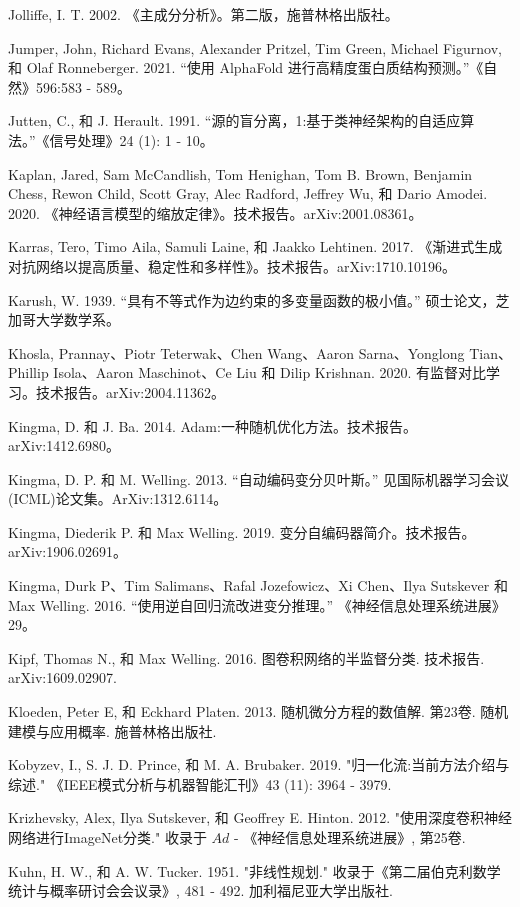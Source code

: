 \documentclass[10pt]{article}
\begin{document}
Jolliffe, I. T. 2002. 《主成分分析》。第二版，施普林格出版社。

Jumper, John, Richard Evans, Alexander Pritzel, Tim Green, Michael Figurnov, 和 Olaf Ronneberger. 2021. “使用 AlphaFold 进行高精度蛋白质结构预测。”《自然》596:583 - 589。

Jutten, C., 和 J. Herault. 1991. “源的盲分离，1:基于类神经架构的自适应算法。”《信号处理》24 (1): 1 - 10。

Kaplan, Jared, Sam McCandlish, Tom Henighan, Tom B. Brown, Benjamin Chess, Rewon Child, Scott Gray, Alec Radford, Jeffrey Wu, 和 Dario Amodei. 2020. 《神经语言模型的缩放定律》。技术报告。arXiv:2001.08361。

Karras, Tero, Timo Aila, Samuli Laine, 和 Jaakko Lehtinen. 2017. 《渐进式生成对抗网络以提高质量、稳定性和多样性》。技术报告。arXiv:1710.10196。

Karush, W. 1939. “具有不等式作为边约束的多变量函数的极小值。” 硕士论文，芝加哥大学数学系。

Khosla, Prannay、Piotr Teterwak、Chen Wang、Aaron Sarna、Yonglong Tian、Phillip Isola、Aaron Maschinot、Ce Liu 和 Dilip Krishnan. 2020. 有监督对比学习。技术报告。arXiv:2004.11362。

Kingma, D. 和 J. Ba. 2014. Adam:一种随机优化方法。技术报告。arXiv:1412.6980。

Kingma, D. P. 和 M. Welling. 2013. “自动编码变分贝叶斯。” 见国际机器学习会议(ICML)论文集。ArXiv:1312.6114。

Kingma, Diederik P. 和 Max Welling. 2019. 变分自编码器简介。技术报告。arXiv:1906.02691。

Kingma, Durk P、Tim Salimans、Rafal Jozefowicz、Xi Chen、Ilya Sutskever 和 Max Welling. 2016. “使用逆自回归流改进变分推理。” 《神经信息处理系统进展》29。

Kipf, Thomas N., 和 Max Welling. 2016. 图卷积网络的半监督分类. 技术报告. arXiv:1609.02907.

Kloeden, Peter E, 和 Eckhard Platen. 2013. 随机微分方程的数值解. 第23卷. 随机建模与应用概率. 施普林格出版社.

Kobyzev, I., S. J. D. Prince, 和 M. A. Brubaker. 2019. "归一化流:当前方法介绍与综述." 《IEEE模式分析与机器智能汇刊》43 (11): 3964 - 3979.

Krizhevsky, Alex, Ilya Sutskever, 和 Geoffrey E. Hinton. 2012. "使用深度卷积神经网络进行ImageNet分类." 收录于 \({Ad}\) - 《神经信息处理系统进展》, 第25卷.

Kuhn, H. W., 和 A. W. Tucker. 1951. "非线性规划." 收录于《第二届伯克利数学统计与概率研讨会会议录》, 481 - 492. 加利福尼亚大学出版社.
\end{document}
